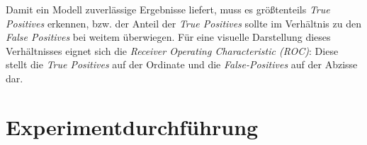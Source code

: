 Damit ein Modell zuverlässige Ergebnisse liefert, muss es größtenteils \textit{True Positives} erkennen, bzw. der Anteil der \textit{True Positives} sollte im Verhältnis zu den \textit{False Positives} bei weitem überwiegen. Für eine visuelle Darstellung dieses Verhältnisses eignet sich die \textit{Receiver Operating Characteristic (ROC)}: Diese stellt die \textit{True Positives} auf der Ordinate und die \textit{False-Positives} auf der Abzisse dar.

\section{Experimentdurchführung}


